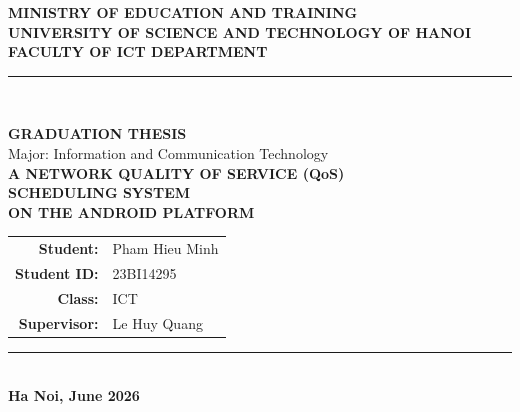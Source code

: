 
\begin{titlepage}
\begin{center}

\textbf{\large MINISTRY OF EDUCATION AND TRAINING}\\[3pt]
\textbf{\large UNIVERSITY OF SCIENCE AND TECHNOLOGY OF HANOI}\\[3pt]
\textbf{\large FACULTY OF ICT DEPARTMENT}\\[5pt]

\rule{\textwidth}{1.5pt}\\[1cm]

\vspace{1cm}

{\Large \textbf{GRADUATION THESIS}}\\[0.5cm]
{\large Major: Information and Communication Technology}\\[1.5cm]

{\LARGE \textbf{A NETWORK QUALITY OF SERVICE (QoS)}}\\[0.3cm]
{\LARGE \textbf{SCHEDULING SYSTEM}}\\[0.3cm]
{\LARGE \textbf{ON THE ANDROID PLATFORM}}\\[2cm]

\begin{tabular}{rl}
\textbf{Student:} & Pham Hieu Minh \\[5pt]
\textbf{Student ID:} & 23BI14295 \\[5pt]
\textbf{Class:} & ICT \\[5pt]
\textbf{Supervisor:} & Le Huy Quang \\[5pt]
\end{tabular}

\vfill

\rule{\textwidth}{1.5pt}\\[10pt]
{\large \textbf{Ha Noi, June 2026}}

\end{center}
\end{titlepage}
